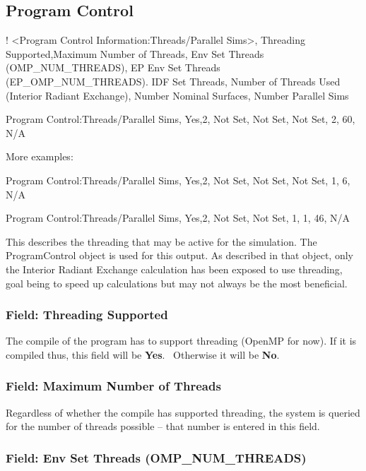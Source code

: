 \subsection{Program Control}\label{program-control}

! \textless{}Program Control Information:Threads/Parallel Sims\textgreater{}, Threading Supported,Maximum Number of Threads, Env Set Threads (OMP\_NUM\_THREADS), EP Env Set Threads (EP\_OMP\_NUM\_THREADS). IDF Set Threads, Number of Threads Used (Interior Radiant Exchange), Number Nominal Surfaces, Number Parallel Sims

Program Control:Threads/Parallel Sims, Yes,2, Not Set, Not Set, Not Set, 2, 60, N/A

More examples:

Program Control:Threads/Parallel Sims, Yes,2, Not Set, Not Set, Not Set, 1, 6, N/A

Program Control:Threads/Parallel Sims, Yes,2, Not Set, Not Set, 1, 1, 46, N/A

This describes the threading that may be active for the simulation. The ProgramControl object is used for this output. As described in that object, only the Interior Radiant Exchange calculation has been exposed to use threading, goal being to speed up calculations but may not always be the most beneficial.

\subsubsection{Field: Threading Supported}\label{field-threading-supported}

The compile of the program has to support threading (OpenMP for now). If it is compiled thus, this field will be \textbf{Yes}.~ Otherwise it will be \textbf{No}.

\subsubsection{Field: Maximum Number of Threads}\label{field-maximum-number-of-threads}

Regardless of whether the compile has supported threading, the system is queried for the number of threads possible -- that number is entered in this field.

\subsubsection{Field: Env Set Threads (OMP\_NUM\_THREADS)}\label{field-env-set-threads-ompux5fnumux5fthreads}

